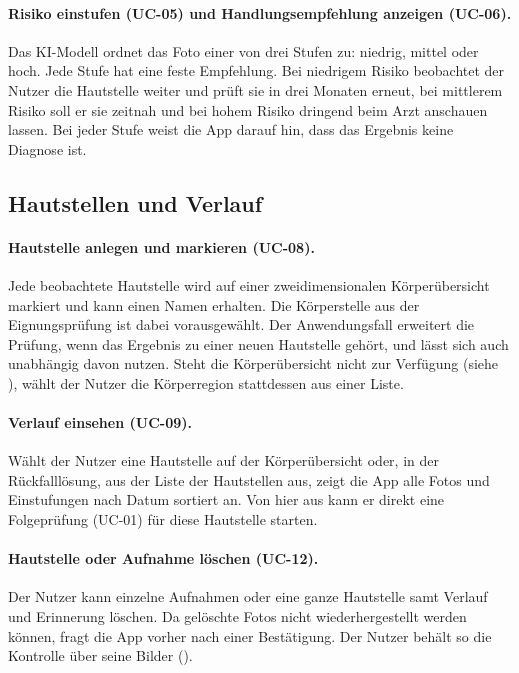 \paragraph{Risiko einstufen (UC-05) und Handlungsempfehlung anzeigen (UC-06).} Das KI-Modell ordnet das Foto einer von drei Stufen zu: niedrig, mittel oder hoch. Jede Stufe hat eine feste Empfehlung. Bei niedrigem Risiko beobachtet der Nutzer die Hautstelle weiter und prüft sie in drei Monaten erneut, bei mittlerem Risiko soll er sie zeitnah und bei hohem Risiko dringend beim Arzt anschauen lassen. Bei jeder Stufe weist die App darauf hin, dass das Ergebnis keine Diagnose ist.

\subsection{Hautstellen und Verlauf}

\paragraph{Hautstelle anlegen und markieren (UC-08).} Jede beobachtete Hautstelle wird auf einer zweidimensionalen Körperübersicht markiert und kann einen Namen erhalten. Die Körperstelle aus der Eignungsprüfung ist dabei vorausgewählt. Der Anwendungsfall erweitert die Prüfung, wenn das Ergebnis zu einer neuen Hautstelle gehört, und lässt sich auch unabhängig davon nutzen. Steht die Körperübersicht nicht zur Verfügung (siehe ), wählt der Nutzer die Körperregion stattdessen aus einer Liste.

\paragraph{Verlauf einsehen (UC-09).} Wählt der Nutzer eine Hautstelle auf der Körperübersicht oder, in der Rückfalllösung, aus der Liste der Hautstellen aus, zeigt die App alle Fotos und Einstufungen nach Datum sortiert an. Von hier aus kann er direkt eine Folgeprüfung (UC-01) für diese Hautstelle starten.

\paragraph{Hautstelle oder Aufnahme löschen (UC-12).} Der Nutzer kann einzelne Aufnahmen oder eine ganze Hautstelle samt Verlauf und Erinnerung löschen. Da gelöschte Fotos nicht wiederhergestellt werden können, fragt die App vorher nach einer Bestätigung. Der Nutzer behält so die Kontrolle über seine Bilder ().

